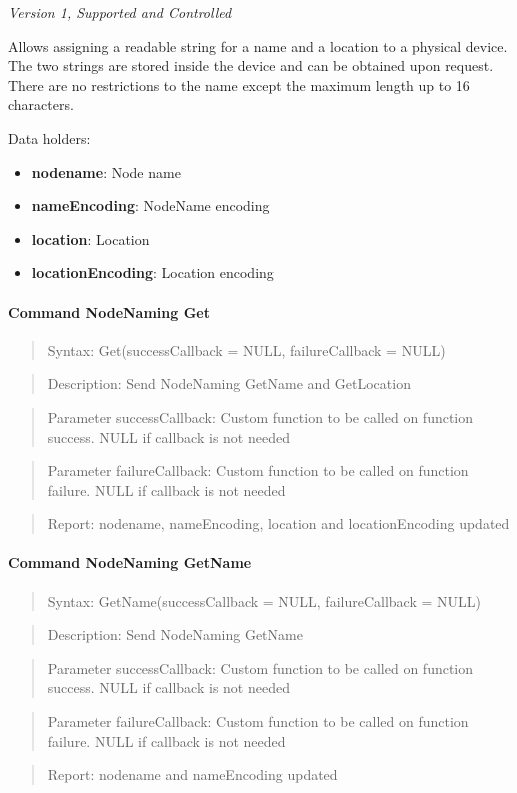 \textit{Version 1, Supported and Controlled}
\newline

Allows assigning a readable string for a name and a location to a physical device. The two strings are stored inside the device and can be obtained upon request. There are no restrictions to the name except the maximum length up to 16 characters.
\newline

\noindent
Data holders:

\begin{itemize}
\item \textbf{nodename}: Node name
\item \textbf{nameEncoding}: NodeName encoding
\item \textbf{location}: Location
\item \textbf{locationEncoding}: Location encoding
\end{itemize}

\paragraph{Command NodeNaming Get}
\begin{quote}Syntax: Get(successCallback = NULL, failureCallback = NULL)\end{quote}
\begin{quote}Description: Send NodeNaming GetName and GetLocation\end{quote}
\begin{quote}Parameter successCallback: Custom function to be called on function success. NULL if callback is not needed\end{quote}
\begin{quote}Parameter failureCallback: Custom function to be called on function failure. NULL if callback is not needed\end{quote}
\begin{quote}Report: nodename, nameEncoding, location and locationEncoding updated\end{quote}

\paragraph{Command NodeNaming GetName}
\begin{quote}Syntax: GetName(successCallback = NULL, failureCallback = NULL)\end{quote}
\begin{quote}Description: Send NodeNaming GetName\end{quote}
\begin{quote}Parameter successCallback: Custom function to be called on function success. NULL if callback is not needed\end{quote}
\begin{quote}Parameter failureCallback: Custom function to be called on function failure. NULL if callback is not needed\end{quote}
\begin{quote}Report: nodename and nameEncoding updated\end{quote}

